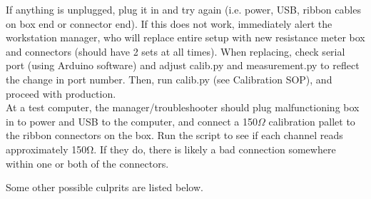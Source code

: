 \documentclass[letterpaper,12pt]{article}
\begin{document}
If anything is unplugged, plug it in and try again (i.e. power, USB, ribbon cables on box end or connector end). If this does not work, immediately alert the workstation manager, who will replace entire setup with new resistance meter box and connectors (should have 2 sets at all times). When replacing, check serial port (using Arduino software) and adjust calib.py and measurement.py to reflect the change in port number. Then, run calib.py (see Calibration SOP), and proceed with production. \\

At a test computer, the manager/troubleshooter should plug malfunctioning box in to power and USB to the computer, and connect a 150$\Omega$ calibration pallet to the ribbon connectors on the box. Run the script to see if each channel reads approximately 150Ω. If they do, there is likely a bad connection somewhere within one or both of the connectors. 

Some other possible culprits are listed below.
\end{document}
